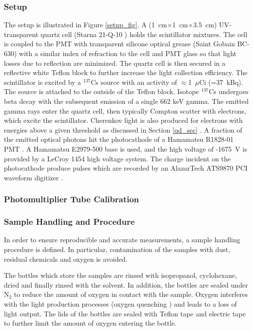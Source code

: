 \documentclass{JINST}
\begin{document}
\subsubsection{Setup}
The setup is illustrated in Figure \ref{setup_fig}. A (1~cm$\times$1~cm$\times$3.5~cm) UV-transparent quartz cell (Starna 21-Q-10 \cite{starnacells}) holds the scintillator mixtures. The cell is coupled to the PMT with transparent silicone optical grease (Saint Gobain BC-630) with a similar index of refraction to the cell and PMT glass so that light losses due to reflection are minimized. The quartz cell is then secured in a reflective white Teflon block to further increase the light collection efficiency. The scintillator is excited by a ${^{137}}$Cs source with an activity of $\approx$1~$\mu$Ci (=37~kBq). The source is attached to the outside of the Teflon block. Isotope ${^{137}}$Cs undergoes beta decay with the subsequent emission of a single 662 keV gamma. The emitted gamma rays enter the quartz cell, then typically Compton scatter with electrons, which excite the scintillator. Cherenkov light is also produced for electrons with energies above a given threshold as discussed in Section  \ref{qd_sec} . A fraction of the emitted optical photons hit the photocathode of a Hamamatsu R1828-01 PMT \cite{hamamatsupmt}. A Hamamatsu E2979-500 base \cite{hamamatsubase} is used, and the high voltage of -1675~V is provided by a LeCroy 1454 high voltage system. The charge incident on the photocathode produce pulses which are recorded by an AlazarTech ATS9870 PCI waveform digitizer \cite{alazartech}. 

\subsubsection{Photomultiplier Tube Calibration}

\subsubsection{Sample Handling and Procedure}
In order to ensure reproducible and accurate measurements, a sample handling procedure is defined. In particular, contamination of the samples with dust, residual chemicals and oxygen is avoided.  

The bottles which store the samples are rinsed with isopropanol, cyclohexane, dried and finally rinsed with the solvent. In addition, the bottles are sealed under N$_{2}$ to reduce the amount of oxygen in contact with the sample. Oxygen interferes with the light production processes (oxygen quenching \cite{birks64}) and leads to a loss of light output. The lids of the bottles are sealed with Teflon tape and electric tape to further limit the amount of oxygen entering the bottle. 
\end{document}
